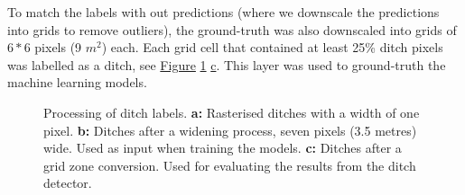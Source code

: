 \documentclass[11pt, review]{elsarticle} %
\providecommand{\DIFaddtex}[1]{{\protect\color{blue}\uwave{#1}}} %
\providecommand{\DIFdeltex}[1]{{\protect\color{red}\sout{#1}}}                      %
\providecommand{\DIFaddFL}[1]{\DIFadd{#1}} %
\providecommand{\DIFdelFL}[1]{\DIFdel{#1}} %
\providecommand{\DIFaddbeginFL}{} %
\providecommand{\DIFaddendFL}{} %
\providecommand{\DIFdelbeginFL}{} %
\providecommand{\DIFdelendFL}{} %
\providecommand{\DIFadd}[1]{\texorpdfstring{\DIFaddtex{#1}}{#1}} %
\providecommand{\DIFdel}[1]{\texorpdfstring{\DIFdeltex{#1}}{}} %
\begin{document}
To match the labels with out predictions (where we downscale the predictions into grids to remove outliers), the ground-truth was also downscaled into grids of $6*6$ pixels (9 $m^2$) each. Each grid cell that contained at least 25\% ditch pixels was labelled as a ditch, see \hyperref[fig:ditchpreprocess]{Figure} \ref{fig:ditchpreprocess} \hyperref[fig:ditchpreprocess]{c}. This layer was used to ground-truth the machine learning models.

\begin{figure} [\DIFdelbeginFL \DIFdelFL{htb!}\DIFdelendFL \DIFaddbeginFL \DIFaddFL{!htb}\DIFaddendFL ]
    \centering
    \DIFdelbeginFL %
\DIFdelFL{\hspace{5pt}
    }%
\DIFdelendFL \DIFaddbeginFL \DIFaddFL{a}{
        }\DIFaddFL{\hspace{5pt}
    b}{
        }
    \DIFaddFL{c}{
        }
    \DIFaddendFL \caption{Processing of ditch labels. \textbf{a: }Rasterised ditches with a width of one pixel. \textbf{b: }Ditches after a widening process, seven pixels (3.5 metres) wide. Used as input when training the models. \textbf{c: }Ditches after a grid zone conversion. Used for evaluating the results from the ditch detector.} \label{sample-figure}
    \label{fig:ditchpreprocess}
\end{figure}
\end{document}
